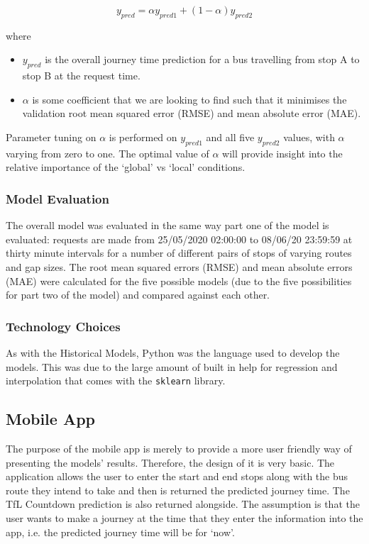 \begin{equation}
\label{eq:regression-overall}
    y_{pred} = \alpha y_{pred1} + (1 - \alpha)y_{pred2}
\end{equation}

where 
\begin{itemize}
    \item $y_{pred}$ is the overall journey time prediction for a bus travelling from stop A to stop B at the request time.
    \item $\alpha$ is some coefficient that we are looking to find such that it minimises the validation root mean squared error (RMSE) and mean absolute error (MAE). 
\end{itemize}

Parameter tuning on $\alpha$ is performed on $y_{pred1}$ and all five $y_{pred2}$ values, with $\alpha$ varying from zero to one. The optimal value of $\alpha$ will provide insight into the relative importance of the `global' vs `local' conditions. 

\subsubsection{Model Evaluation}

The overall model was evaluated in the same way part one of the model is evaluated: requests are made from 25/05/2020 02:00:00 to 08/06/20 23:59:59 at thirty minute intervals for a number of different pairs of stops of varying routes and gap sizes. The root mean squared errors (RMSE) and mean absolute errors (MAE) were calculated for the five possible models (due to the five possibilities for part two of the model) and compared against each other.

\subsubsection{Technology Choices}

As with the Historical Models, Python was the language used to develop the models. This was due to the large amount of built in help for regression and interpolation that comes with the \texttt{sklearn} library. 

\subsection{Mobile App}

The purpose of the mobile app is merely to provide a more user friendly way of presenting the models' results. Therefore, the design of it is very basic. The application allows the user to enter the start and end stops along with the bus route they intend to take and then is returned the predicted journey time. The TfL Countdown prediction is also returned alongside. The assumption is that the user wants to make a journey at the time that they enter the information into the app, i.e. the predicted journey time will be for `now'. \\

